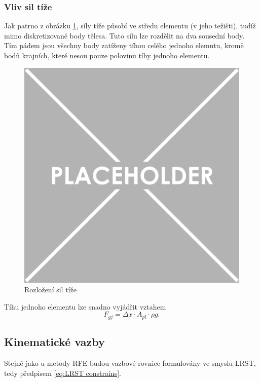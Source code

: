 \subsubsection{Vliv sil tíže}

Jak patrno z obrázku \ref{fig:MBS_tiha}, síly tíže působí ve středu elementu (v jeho težišti), tudíž mimo diskretizované body tělesa. Tuto sílu lze rozdělit na dva sousední body. Tím pádem jsou všechny body zatíženy tíhou celého jednoho elemntu, kromě bodů krajních, které nesou pouze polovinu tíhy jednoho elementu.

\begin{figure}[H]
	\centering
	\includegraphics[width=0.85\linewidth]{img/placeholder.pdf}
	\caption{Rozložení sil tíže}
	\label{fig:MBS_tiha}
\end{figure}

Tíhu jednoho elementu lze snadno vyjádřit vztahem
\begin{equation}\label{eq:MBS_tiha}
	F_{gj}=\Delta x \cdot A_{pl} \cdot \rho g.
\end{equation}

\subsection{Kinematické vazby}
Stejně jako u metody RFE budou vazbové rovnice formulovány ve smyslu LRST, tedy předpisem \ref{eq:LRST constrains}.

